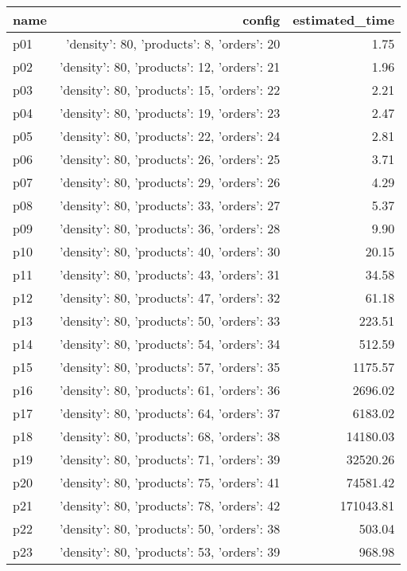 \documentclass{article}
\begin{document}
                            \begin{center}
                            \scriptsize
                            \begin{tabular}{@{}l|r|r@{}}
                            name & config & estimated\_time\\\midrule
                              p01&{'density': 80, 'products': 8, 'orders': 20}&1.75\\
  p02&{'density': 80, 'products': 12, 'orders': 21}&1.96\\
  p03&{'density': 80, 'products': 15, 'orders': 22}&2.21\\
  p04&{'density': 80, 'products': 19, 'orders': 23}&2.47\\
  p05&{'density': 80, 'products': 22, 'orders': 24}&2.81\\
  p06&{'density': 80, 'products': 26, 'orders': 25}&3.71\\
  p07&{'density': 80, 'products': 29, 'orders': 26}&4.29\\
  p08&{'density': 80, 'products': 33, 'orders': 27}&5.37\\
  p09&{'density': 80, 'products': 36, 'orders': 28}&9.90\\
  p10&{'density': 80, 'products': 40, 'orders': 30}&20.15\\
  p11&{'density': 80, 'products': 43, 'orders': 31}&34.58\\
  p12&{'density': 80, 'products': 47, 'orders': 32}&61.18\\
  p13&{'density': 80, 'products': 50, 'orders': 33}&223.51\\
  p14&{'density': 80, 'products': 54, 'orders': 34}&512.59\\
  p15&{'density': 80, 'products': 57, 'orders': 35}&1175.57\\
  p16&{'density': 80, 'products': 61, 'orders': 36}&2696.02\\
  p17&{'density': 80, 'products': 64, 'orders': 37}&6183.02\\
  p18&{'density': 80, 'products': 68, 'orders': 38}&14180.03\\
  p19&{'density': 80, 'products': 71, 'orders': 39}&32520.26\\
  p20&{'density': 80, 'products': 75, 'orders': 41}&74581.42\\
  p21&{'density': 80, 'products': 78, 'orders': 42}&171043.81\\
  p22&{'density': 80, 'products': 50, 'orders': 38}&503.04\\
  p23&{'density': 80, 'products': 53, 'orders': 39}&968.98\\

\end{tabular}
\end{center}
\end{document}
